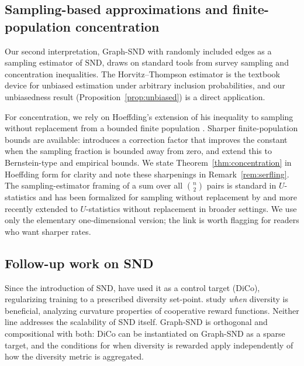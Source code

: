 \documentclass[11pt]{article}
\theoremstyle{plain}
\theoremstyle{definition}
\theoremstyle{remark}
\newcommand{\SND}{\ensuremath{\mathrm{SND}}}
\begin{document}
\subsection{Sampling-based approximations and finite-population
concentration}

Our second interpretation, Graph-SND with randomly included edges
as a sampling estimator of $\SND$, draws on standard tools from
survey sampling and concentration inequalities. The Horvitz--Thompson
estimator \citep{horvitz1952generalization} is the textbook device for
unbiased estimation under arbitrary inclusion probabilities, and our
unbiasedness result (Proposition~\ref{prop:unbiased}) is a direct
application.

For concentration, we rely on Hoeffding's extension of his inequality
to sampling without replacement from a bounded finite population
\citep[\S 6]{hoeffding1963probability}. Sharper finite-population
bounds are available: \citet{serfling1974probability} introduces a
correction factor that improves the constant when the sampling
fraction is bounded away from zero, and
\citet{bardenet2015concentration} extend this to Bernstein-type and
empirical bounds. We state
Theorem~\ref{thm:concentration} in Hoeffding form for clarity and note
these sharpenings in Remark~\ref{rem:serfling}. The sampling-estimator
framing of a sum over all $\binom{n}{2}$ pairs is standard in
$U$-statistics \citep{hoeffding1948class} and has been formalized for
sampling without replacement by \citet{hoeffding1963probability}
and more recently extended to $U$-statistics without replacement in
broader settings. We use only the elementary one-dimensional version;
the link is worth flagging for readers who want sharper rates.

\subsection{Follow-up work on SND}

Since the introduction of SND, \citet{bettini2024dico} have used it as
a control target (DiCo), regularizing training to a prescribed
diversity set-point. \citet{amir2025diversity} study \emph{when}
diversity is beneficial, analyzing curvature properties of cooperative
reward functions. Neither line addresses the scalability of SND
itself. Graph-SND is orthogonal and compositional with both: DiCo can
be instantiated on Graph-SND as a sparse target, and
the conditions for when diversity is rewarded apply independently of
how the diversity metric is aggregated.
\end{document}
